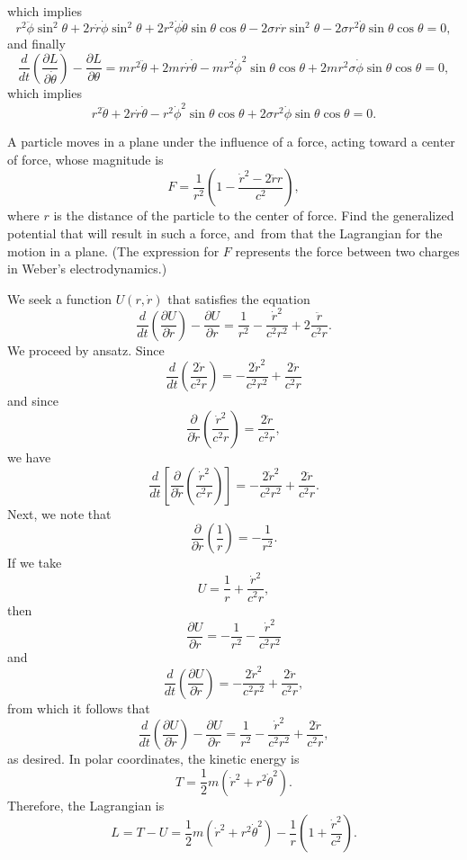 \begin{questions}
\begin{solution}
\begin{parts}
\begin{align*}
\end{align*}
which implies
\[
r^2 \ddot{\phi} \sin^2 \theta + 2 r \dot{r} \dot{\phi} \sin^2 \theta + 2 r^2 \dot{\phi} \dot{\theta} \sin \theta \cos \theta - 2 \sigma r \dot{r} \sin^2 \theta - 2 \sigma r^2 \dot{\theta} \sin \theta \cos \theta = 0,
\]
and finally
\[
\frac{d}{dt} \left( \frac{\partial L}{\partial \dot{\theta}} \right) - \frac{\partial L}{\partial \theta} = m r^2 \ddot{\theta} + 2 m r \dot{r} \dot{\theta} - m r^2 \dot{\phi}^2 \sin \theta \cos \theta + 2 m r^2 \sigma \dot{\phi} \sin \theta \cos \theta = 0,
\]
which implies
\[
r^2 \ddot{\theta} + 2 r \dot{r} \dot{\theta} - r^2 \dot{\phi}^2 \sin \theta \cos \theta + 2 \sigma r^2 \dot{\phi} \sin \theta \cos \theta = 0.
\]
\end{parts}
\end{solution}

\question 
A particle moves in a plane under the influence of a force, acting toward a center of force, whose magnitude is
\[
F = \frac{1}{r^2} \left( 1 - \frac{\dot{r}^2 - 2 \ddot{r} r}{c^2} \right),
\]
where $r$ is the distance of the particle to the center of force. Find the generalized potential that will result in such a force, and from that the Lagrangian for the motion in a plane. (The expression for $F$ represents the force between two charges in Weber's electrodynamics.)
\begin{solution}
We seek a function $U( r, \dot{r} )$ that satisfies the equation
\[
\frac{d}{dt} \left( \frac{\partial U}{\partial \dot{r}} \right) - \frac{\partial U}{\partial r} = \frac{1}{r^2} - \frac{\dot{r}^2}{c^2 r^2} + 2 \frac{\ddot{r}}{c^2 r}.
\]
We proceed by ansatz. Since
\[
\frac{d}{dt} \left( \frac{2 \dot{r}}{c^2 r} \right) = -\frac{2 \dot{r}^2}{c^2 r^2} + \frac{2 \ddot{r}}{c^2 r} 
\]
and since
\[
\frac{\partial}{\partial \dot{r}} \left( \frac{\dot{r}^2}{c^2 r} \right) = \frac{2 \dot{r}}{c^2 r},
\]
we have
\[
\frac{d}{dt} \left[ \frac{\partial}{\partial \dot{r}} \left( \frac{\dot{r}^2}{c^2 r} \right) \right] = -\frac{2 \dot{r}^2}{c^2 r^2} + \frac{2 \ddot{r}}{c^2 r}.
\]
Next, we note that
\[
\frac{\partial}{\partial r} \left( \frac{1}{r} \right) = -\frac{1}{r^2}.
\]
If we take
\[
U = \frac{1}{r} + \frac{\dot{r}^2}{c^2 r},
\]
then
\[
\frac{\partial U}{\partial r} = -\frac{1}{r^2} - \frac{\dot{r}^2}{c^2 r^2}
\]
and
\[
\frac{d}{dt} \left( \frac{\partial U}{\partial \dot{r}} \right) = -\frac{2 \dot{r}^2}{c^2 r^2} + \frac{2 \ddot{r}}{c^2 r},
\]
from which it follows that
\[
\frac{d}{dt} \left( \frac{\partial U}{\partial \dot{r}} \right) - \frac{\partial U}{\partial r} = \frac{1}{r^2} - \frac{\dot{r}^2}{c^2 r^2} + \frac{2 \ddot{r}}{c^2 r},
\]
as desired. In polar coordinates, the kinetic energy is
\[
T = \frac{1}{2} m ( \dot{r}^2 + r^2 \dot{\theta}^2 ).
\]
Therefore, the Lagrangian is
\[
L = T - U = \frac{1}{2} m ( \dot{r}^2 + r^2 \dot{\theta}^2 ) - \frac{1}{r} \left( 1 + \frac{\dot{r}^2}{c^2} \right).
\]
\end{solution}


\end{questions}
